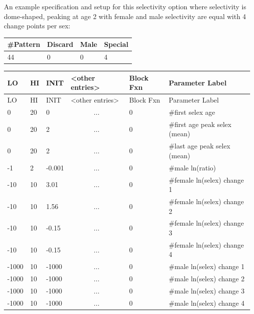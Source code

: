 An example specification and setup for this selectivity option where selectivity is dome-shaped, peaking at age 2 with female and male selectivity are equal with 4 change points per sex:
	\begin{center}
		\begin{longtable}{p{1.5cm} p{1.5cm} p{1.5cm} p{1.5cm}}
			\hline
			\#Pattern & Discard & Male & Special \Tstrut\Bstrut\\
			\hline
			44 & 0 & 0 & 4 \Tstrut\Bstrut\\
			\hline
		\end{longtable}
	\end{center}

	\begin{longtable}{p{1cm} p{1cm} p{1cm} p{2.9cm} p{1.8cm} p{5.1cm}}
		\hline
		LO \Tstrut & HI & INIT & <other entries> & Block Fxn & Parameter Label \Bstrut\\
		\hline
		\endfirsthead
	
		\hline
		LO \Tstrut & HI & INIT & <other entries> & Block Fxn & Parameter Label \Bstrut\\
		\hline
		\endhead

		0     & 20 &  0     & \multicolumn{1}{c}{...} & 0 & \#first selex age \Tstrut\\
		0     & 20 &  2     & \multicolumn{1}{c}{...} & 0 & \#first age peak selex (mean) \\
		0     & 20 &  2     & \multicolumn{1}{c}{...} & 0 & \#last age peak selex (mean) \\
		-1    & 2  & -0.001 & \multicolumn{1}{c}{...} & 0 & \#male ln(ratio) \\
		-10   & 10 &  3.01  & \multicolumn{1}{c}{...} & 0 & \#female ln(selex) change 1 \\
		-10   & 10 &  1.56  & \multicolumn{1}{c}{...} & 0 & \#female ln(selex) change 2 \\
		-10   & 10 & -0.15  & \multicolumn{1}{c}{...} & 0 & \#female ln(selex) change 3 \\
		-10   & 10 & -0.15  & \multicolumn{1}{c}{...} & 0 & \#female ln(selex) change 4 \\
		-1000 & 10 & -1000  & \multicolumn{1}{c}{...} & 0 & \#male ln(selex) change 1 \\
		-1000 & 10 & -1000  & \multicolumn{1}{c}{...} & 0 & \#male ln(selex) change 2 \\
		-1000 & 10 & -1000  & \multicolumn{1}{c}{...} & 0 & \#male ln(selex) change 3 \\
		-1000 & 10 & -1000  & \multicolumn{1}{c}{...} & 0 & \#male ln(selex) change 4 \Bstrut\\
		\hline
	\end{longtable}

